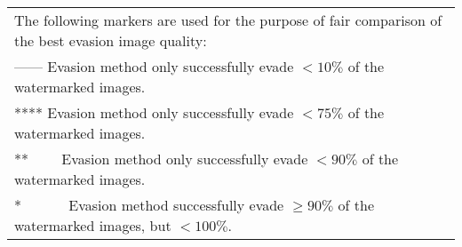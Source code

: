\begin{table*}[!htbp]
{\begin{tabular}{l c cccc}
\toprule
\multicolumn{6}{l}{The following markers are used for the purpose of fair comparison of the best evasion image quality:}\\
\multicolumn{6}{l}{------ Evasion method only successfully evade $<10 \%$ of the watermarked images.}\\
\multicolumn{6}{l}{**** Evasion method only successfully evade $<75\%$ of the watermarked images.}\\
\multicolumn{6}{l}{**~~~~ Evasion method only successfully evade $<90\%$ of the watermarked images.}\\
\multicolumn{6}{l}{*~~~~~~ Evasion method successfully evade $\ge 90\%$ of the watermarked images, but $< 100\%$.}\\
\bottomrule
\end{tabular}}
\vspace{-1em}
\end{table*}%
